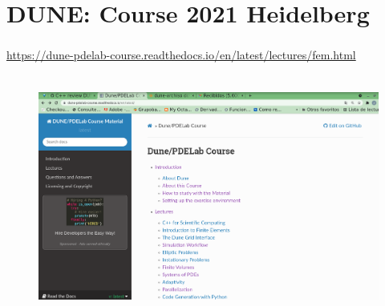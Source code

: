 \section{DUNE: Course 2021 Heidelberg}
\begin{frame}[fragile]
	\frametitle{\secname}
	\url{https://dune-pdelab-course.readthedocs.io/en/latest/lectures/fem.html}
	\begin{figure}[ht!]
		\centering
		\includegraphics[height=8cm, width=12cm]{dune_course_2021}
	\end{figure}
\end{frame}
{
\begin{frame}[plain]
\end{frame}
}


